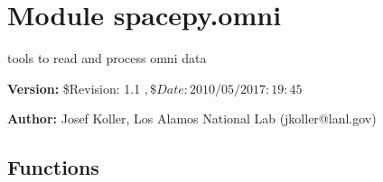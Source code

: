 %
%
%


\section{Module spacepy.omni}

    \label{spacepy:omni}
tools to read and process omni data

\textbf{Version:} \$Revision: 1.1 $, \$Date: 2010/05/20 17:19:45 $



\textbf{Author:} Josef Koller, Los Alamos National Lab (jkoller@lanl.gov)





  \subsection{Functions}

    \label{spacepy:omni:getomni}

    \vspace{0.5ex}

